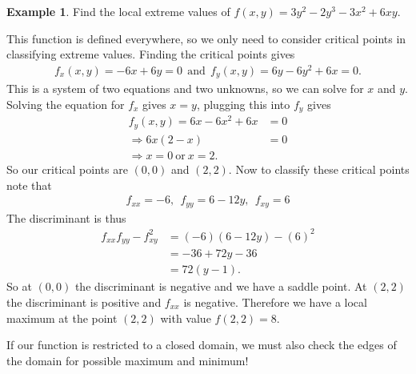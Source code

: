 \documentclass[12pt, letter]{article}
\theoremstyle{plain}
\numberwithin{theorem}{section}
\theoremstyle{definition}
\newtheorem{example}[theorem]{Example}
\begin{document}
\begin{example}
Find the local extreme values of $f(x,y) = 3y^2-2y^3-3x^2+6xy$.

\smallskip

This function is defined everywhere, so we only need to consider critical points in classifying extreme values. Finding the critical points gives
\begin{align*}
f_x(x,y) = -6x+6y=0 \ \ \text{and} \ \ f_y(x,y) = 6y-6y^2+6x=0.
\end{align*}
This is a system of two equations and two unknowns, so we can solve for $x$ and $y$. Solving the equation for $f_x$ gives $x=y$, plugging this into $f_y$ gives
\begin{align*}
f_y(x,y) = 6x-6x^2+6x &= 0\\
\Rightarrow 6x(2-x) &=0\\
\Rightarrow x=0 \ \text{or} \ x=2.
\end{align*}
So our critical points are $(0,0)$ and $(2,2)$. Now to classify these critical points note that
\begin{align*}
f_{xx} = -6, \ \ f_{yy} = 6-12y, \ \ f_{xy} = 6
\end{align*}
The discriminant is thus
\begin{align*}
f_{xx}f_{yy}-f_{xy}^2 &= (-6)(6-12y) - (6)^2\\
&= -36+72y-36\\
&= 72(y-1).
\end{align*}
So at $(0,0)$ the discriminant is negative and we have a saddle point. At $(2,2)$ the discriminant is positive and $f_{xx}$ is negative. Therefore we have a local maximum at the point $(2,2)$ with value $f(2,2) = 8$.
\end{example}

\bigskip

\hrulefill

\bigskip

If our function is restricted to a closed domain, we must also check the edges of the domain for possible maximum and minimum!

\bigskip

\hrulefill

\bigskip
\end{document}
